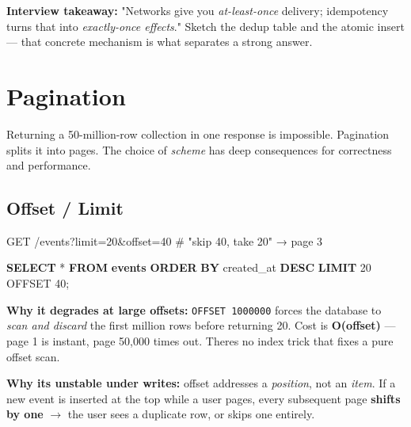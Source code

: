 \documentclass[11pt]{article}
\newenvironment{Shaded}{\begin{snugshade}}{\end{snugshade}}
\newcommand{\DecValTok}[1]{\textcolor[rgb]{0.96,0.45,0.00}{#1}}
\newcommand{\KeywordTok}[1]{\textcolor[rgb]{0.81,0.81,0.76}{\textbf{#1}}}
\newcommand{\NormalTok}[1]{\textcolor[rgb]{0.81,0.81,0.76}{#1}}
\newcommand{\OperatorTok}[1]{\textcolor[rgb]{0.81,0.81,0.76}{#1}}
\begin{document}
\textbf{Interview takeaway:} "Networks give you \emph{at-least-once} delivery; idempotency turns that into \emph{exactly-once effects}." Sketch the dedup table and the atomic insert --- that concrete mechanism is what separates a strong answer.

\section{Pagination}\label{pagination}

Returning a 50-million-row collection in one response is impossible. Pagination splits it into pages. The choice of \emph{scheme} has deep consequences for correctness and performance.

\subsection{Offset / Limit}\label{offset--limit}


\begin{Shaded}
\begin{Highlighting}[]
\NormalTok{GET /events?limit=20\&offset=40        \# "skip 40, take 20" → page 3}
\end{Highlighting}
\end{Shaded}


\begin{Shaded}
\begin{Highlighting}[]
\KeywordTok{SELECT} \OperatorTok{*} \KeywordTok{FROM} \KeywordTok{events}
\KeywordTok{ORDER} \KeywordTok{BY}\NormalTok{ created\_at }\KeywordTok{DESC}
\KeywordTok{LIMIT} \DecValTok{20}\NormalTok{ OFFSET }\DecValTok{40}\NormalTok{;}
\end{Highlighting}
\end{Shaded}

\textbf{Why it degrades at large offsets:} \texttt{OFFSET\ 1000000} forces the database to \emph{scan and discard} the first million rows before returning 20. Cost is \textbf{O(offset)} --- page 1 is instant, page 50,000 times out. There\textquotesingle s no index trick that fixes a pure offset scan.

\textbf{Why it\textquotesingle s unstable under writes:} offset addresses a \emph{position}, not an \emph{item}. If a new event is inserted at the top while a user pages, every subsequent page \textbf{shifts by one} \(\rightarrow\) the user sees a duplicate row, or skips one entirely.
\end{document}
